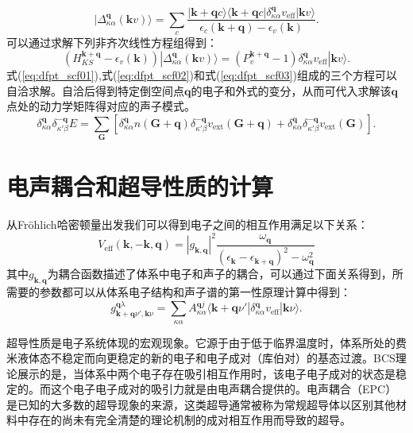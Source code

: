 \begin{equation}\label{eq:dfpt_scf02}
  | \Delta^{\bm{q}}_{\kappa\alpha}(\bm{k}v) \rangle =
  \sum_c \frac{|\bm{k}+\bm{q}c\rangle \langle \bm{k}+\bm{q}c | \delta^{\bm{q}}_{\kappa\alpha} v_\mathrm{eff} | \bm{k}v \rangle}
  {\epsilon_c(\bm{k}+\bm{q})-\epsilon_v(\bm{k})}.
\end{equation}
可以通过求解下列非齐次线性方程组得到：
\begin{equation}\label{eq:dfpt_scf03}
  (H^{\bm{k}+\bm{q}}_{KS}-\epsilon_v(\bm{k}))|\Delta^{\bm{q}}_{\kappa\alpha}(\bm{k}v)\rangle =
  (P^{\bm{k}+\bm{q}}_v-1)\delta^{\bm{q}}_{\kappa\alpha}v_\mathrm{eff}|\bm{k}v\rangle .
\end{equation}
式(\ref{eq:dfpt_scf01}),式(\ref{eq:dfpt_scf02})和式(\ref{eq:dfpt_scf03})组成的三个方程可以自洽求解。自洽后得到特定倒空间点$\bm{q}$的电子和外式的变分，从而可代入求解该$\bm{q}$点处的动力学矩阵得对应的声子模式。
\begin{equation}
  \delta^{\bm{q}}_{\kappa\alpha}\delta^{-\bm{q}}_{\kappa'\beta} E =
  \sum_{\bm{G}} [ \delta^{\bm{q}}_{\kappa\alpha}n(\bm{G}+\bm{q})\delta^{\bm{-q}}_{\kappa'\beta}v_\mathrm{ext}(\bm{G}+\bm{q}) + \delta^{\bm{q}}_{\kappa\alpha}\delta^{\bm{-q}}_{\kappa'\beta} v_\mathrm{ext}(\bm{G})].
\end{equation}

\section{电声耦合和超导性质的计算}
从Fr{\"o}hlich哈密顿量\cite{frohlich1954theory}出发我们可以得到电子之间的相互作用满足以下关系：
\begin{equation}
  V_{\mathrm{eff}}(\bm{k},-\bm{k},\bm{q}) = |g_{\bm{k},\bm{q}}|^2
  \frac{\omega_{\bm{q}}}{(\epsilon_{\bm{k}}-\epsilon_{\bm{k}+\bm{q}})^2-\omega^2_{\bm{q}}}
\end{equation}
其中$g_{\bm{k},\bm{q}}$为耦合函数描述了体系中电子和声子的耦合，可以通过下面关系得到，所需要的参数都可以从体系电子结构和声子谱的第一性原理计算中得到：
\begin{equation}\label{eq:coupling_coeff}
  g^{\bm{q}\lambda}_{\bm{k}+\bm{q}\nu',\bm{k}\nu} =
  \sum_{\kappa\alpha} A^{\bm{q}j}_{\kappa\alpha}
  \langle {\bm{k}+\bm{q}\nu'} | {\delta^{\bm{q}}_{\kappa\alpha}v_{\mathrm{eff}}} | {\bm{k}\nu} \rangle .
\end{equation}

超导性质是电子系统体现的宏观现象。它源于由于低于临界温度时，体系所处的费米液体态不稳定而向更稳定的新的电子和电子成对（库伯对）的基态过渡。BCS理论\cite{bardeen1957theory}展示的是，当体系中两个电子存在吸引相互作用时，该电子电子成对的状态是稳定的。而这个电子电子成对的吸引力就是由电声耦合提供的。电声耦合（EPC）是已知的大多数的超导现象的来源，这类超导通常被称为常规超导体以区别其他材料中存在的尚未有完全清楚的理论机制的成对相互作用而导致的超导。

